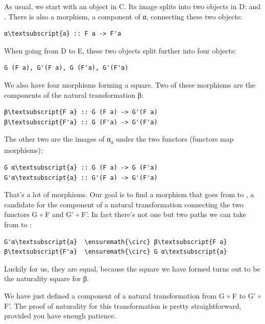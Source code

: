 \noindent
As usual, we start with an object  in C. Its image splits into
two objects in D:  and . There is also a
morphism, a component of α, connecting these two objects:

\begin{Verbatim}[commandchars=\\\{\}]
α\textsubscript{a} :: F a -> F'a
\end{Verbatim}
When going from D to E, these two objects split further into four
objects:

\begin{Verbatim}[commandchars=\\\{\}]
G (F a), G'(F a), G (F'a), G'(F'a)
\end{Verbatim}
We also have four morphisms forming a square. Two of these morphisms are
the components of the natural transformation β:

\begin{Verbatim}[commandchars=\\\{\}]
β\textsubscript{F a} :: G (F a) -> G'(F a)
β\textsubscript{F'a} :: G (F'a) -> G'(F'a)
\end{Verbatim}
The other two are the images of α\textsubscript{a} under the two
functors (functors map morphisms):

\begin{Verbatim}[commandchars=\\\{\}]
G α\textsubscript{a} :: G (F a) -> G (F'a)
G'α\textsubscript{a} :: G'(F a) -> G'(F'a)
\end{Verbatim}
That's a lot of morphisms. Our goal is to find a morphism that goes from
 to , a candidate for the
component of a natural transformation connecting the two functors G  \ensuremath{\circ} F
and G' \ensuremath{\circ} F'. In fact there's not one but two paths we can take from
 to :

\begin{Verbatim}[commandchars=\\\{\}]
G'α\textsubscript{a}  \ensuremath{\circ} β\textsubscript{F a}
β\textsubscript{F'a}  \ensuremath{\circ} G α\textsubscript{a}
\end{Verbatim}
Luckily for us, they are equal, because the square we have formed turns
out to be the naturality square for β.

We have just defined a component of a natural transformation from G  \ensuremath{\circ} F
to G' \ensuremath{\circ} F'. The proof of naturality for this transformation is pretty
straightforward, provided you have enough patience.

